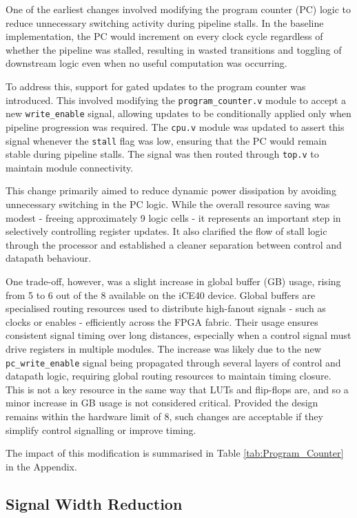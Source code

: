 \documentclass[a4paper,10pt]{article}
\begin{document}
One of the earliest changes involved modifying the program counter (PC) logic 
to reduce unnecessary switching activity during pipeline stalls. 
In the baseline implementation, the PC would increment 
on every clock cycle regardless of whether the pipeline was stalled, 
resulting in wasted transitions and toggling of downstream logic even 
when no useful computation was occurring.

To address this, support for gated updates to the program counter was introduced. 
This involved modifying the \texttt{program\_counter.v} module to accept 
a new \texttt{write\_enable} signal, 
allowing updates to be conditionally applied only when 
pipeline progression was required. 
The \texttt{cpu.v} module was updated to assert this signal whenever 
the \texttt{stall} flag was low, 
ensuring that the PC would remain stable during pipeline stalls. 
The signal was then routed through \texttt{top.v} to maintain module connectivity.

This change primarily aimed to reduce dynamic power dissipation by 
avoiding unnecessary switching in the PC logic. 
While the overall resource saving was modest - 
freeing approximately 9 logic cells - 
it represents an important step in selectively controlling register updates. 
It also clarified the flow of stall logic through the processor 
and established a cleaner separation between control and datapath behaviour. 

One trade-off, however, was a slight increase in global buffer (GB) usage, 
rising from 5 to 6 out of the 8 available on the iCE40 device. 
Global buffers are specialised routing resources used to 
distribute high-fanout signals - 
such as clocks or enables - efficiently across the FPGA fabric. 
Their usage ensures consistent signal timing over long distances, 
especially when a control signal must drive registers in multiple modules. 
The increase was likely due to the new 
\texttt{pc\_write\_enable} signal being propagated through 
several layers of control and datapath logic, 
requiring global routing resources to maintain timing closure.
This is not a key resource in the same way that LUTs and flip-flops are, 
and so a minor increase in GB usage is not considered critical. 
Provided the design remains within the hardware limit of 8, 
such changes are acceptable if they simplify control signalling or improve timing.

The impact of this modification is 
summarised in Table \ref{tab:Program_Counter} in the Appendix.

\subsection{Signal Width Reduction}
\label{sec:Signal_Width}
\end{document}
